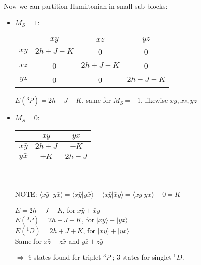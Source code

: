 \documentclass[a4paper, 12pt]{article}
\begin{document}
Now we can partition Hamiltonian in small sub-blocks:
\begin{itemize}
	\item $M_S=1$: 
	\begin{center}
\begin{tabular}{|c|c|c|c|} 
\hline 
 & $xy$ & $xz$ & $yz$\\
\hline  
$xy$ & $2h+J-K$ & 0 & 0\\
\hline  
$xz$  & 0 & $2h+J-K$ & 0\\
\hline  
$yz$  & 0 &0 & $2h+J-K$\\
\hline
\end{tabular}
\end{center}
 $E(^3P)= 2h+J-K$, same for $M_S= -1$, likewise $\bar{x}\bar{y},\bar{x}\bar{z}, \bar{y}\bar{z}$
 \item $M_S=0$: 
 	\begin{center}
\begin{tabular}{|c|c|c|} 
\hline 
 & $x\bar{y}$ & $y\bar{x}$ \\
\hline  
$x\bar{y}$ & $2h+J$ & $+K$\\
\hline  
 $y\bar{x}$ & $+K$ & $2h+J$\\
\hline
\end{tabular}
\\ \hspace*{\fill} \\
NOTE: $\langle x\bar{y}||y\bar{x} \rangle =\langle x\bar{y}|y\bar{x} \rangle - \langle x\bar{y}|\bar{x}y \rangle = \langle xy|yx \rangle -0 = K $
\end{center}
 $E= 2h+J \pm K$,  for $x\bar{y}+\bar{x}y$\\
 $E(^3P)= 2h+J-K$,  for $|x\bar{y}\rangle -|y\bar{x}\rangle$\\
 $E(^1D)= 2h+J+K$,  for $|x\bar{y}\rangle +|y\bar{x}\rangle$\\
Same for $x\bar{z}\pm z\bar{x}$ and $y\bar{z}\pm z\bar{y}$ 
 
$\Rightarrow$ 9 states found for triplet $^3P$ ; 3 states for singlet $^1D$.
 

\end{itemize}
\end{document}
